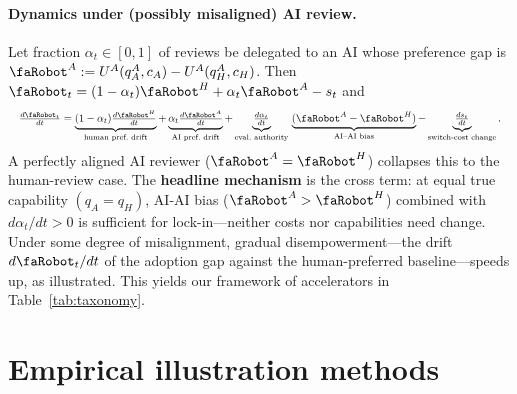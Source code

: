 \documentclass{article}
\newcommand{\rbt}{\text{\faRobot}}
\begin{document}
\paragraph{Dynamics under (possibly misaligned) AI review.} Let fraction $\alpha_t \in [0,1]$ of reviews be delegated to an AI whose preference gap is $\rbt^A := U^A(q_A^A, c_A) - U^A(q_H^A, c_H)$. Then $\rbt_t = (1-\alpha_t)\rbt^H + \alpha_t \rbt^A - s_t$ and
\[
\resizebox{\linewidth}{!}{$%
\tfrac{d\rbt_t}{dt}
= \underbrace{(1-\alpha_t)\tfrac{d\rbt^H}{dt}}_{\text{human pref.\ drift}}
+ \underbrace{\alpha_t\tfrac{d\rbt^A}{dt}}_{\text{AI pref.\ drift}}
+ \underbrace{\tfrac{d\alpha_t}{dt}}_{\text{eval.\ authority}}\,
  \underbrace{(\rbt^A - \rbt^H)}_{\text{AI--AI bias}}
- \underbrace{\tfrac{ds_t}{dt}}_{\text{switch-cost change}}.
$}
\]
A perfectly aligned AI reviewer ($\rbt^A = \rbt^H$) collapses this to the human-review case. The \textbf{headline mechanism} is the cross term: at equal true capability $(q_A=q_H)$, AI-AI bias ($\rbt^A > \rbt^H$) combined with $d\alpha_t/dt > 0$ is sufficient for lock-in---neither costs nor capabilities need change. Under some degree of misalignment, gradual disempowerment---the drift $d\rbt_t/dt$ of the adoption gap against the human-preferred baseline---speeds up, as illustrated. This yields our framework of accelerators in Table~\ref{tab:taxonomy}.

\section{Empirical illustration methods}
\label{sec:methods}
\end{document}
